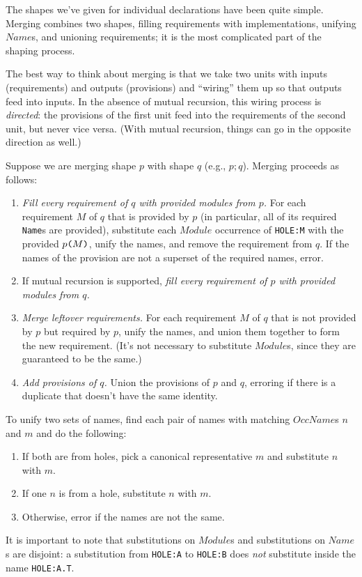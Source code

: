 \documentclass{article}
\newcommand{\I}[1]{\ensuremath{\mathit{#1}}}
\begin{document}
The shapes we've given for individual declarations have been quite
simple.  Merging combines two shapes, filling requirements with
implementations, unifying \I{Name}s, and unioning requirements; it is
the most complicated part of the shaping process.

The best way to think about merging is that we take two units with
inputs (requirements) and outputs (provisions) and ``wiring'' them up so
that outputs feed into inputs.  In the absence
of mutual recursion, this wiring process is \emph{directed}: the provisions
of the first unit feed into the requirements of the second unit,
but never vice versa.  (With mutual recursion, things can go in the opposite
direction as well.)

Suppose we are merging shape $p$ with shape $q$ (e.g., $p; q$).  Merging
proceeds as follows:

\begin{enumerate}
    \item \emph{Fill every requirement of $q$ with provided modules from
        $p$.} For each requirement $M$ of $q$ that is provided by $p$ (in particular,
        all of its required \verb|Name|s are provided),
        substitute each \I{Module} occurrence of \verb|HOLE:M| with the
        provided $p\verb|(|M\verb|)|$, unify the names, and remove the requirement from $q$.
        If the names of the provision are not a superset of the required names, error.
    \item If mutual recursion is supported, \emph{fill every requirement of $p$ with provided modules from $q$.}
    \item \emph{Merge leftover requirements.}  For each requirement $M$ of $q$ that is not
        provided by $p$ but required by $p$, unify the names, and union them together to form the new requirement.  (It's not
        necessary to substitute \I{Module}s, since they are guaranteed to be the same.)
    \item \emph{Add provisions of $q$.} Union the provisions of $p$ and $q$, erroring
        if there is a duplicate that doesn't have the same identity.
\end{enumerate}
%
To unify two sets of names, find each pair of names with matching \I{OccName}s $n$ and $m$ and do the following:

\begin{enumerate}
    \item If both are from holes, pick a canonical representative $m$ and substitute $n$ with $m$.
    \item If one $n$ is from a hole, substitute $n$ with $m$.
    \item Otherwise, error if the names are not the same.
\end{enumerate}
%
It is important to note that substitutions on \I{Module}s and substitutions on
\I{Name}s are disjoint: a substitution from \verb|HOLE:A| to \verb|HOLE:B|
does \emph{not} substitute inside the name \verb|HOLE:A.T|.
\end{document}

